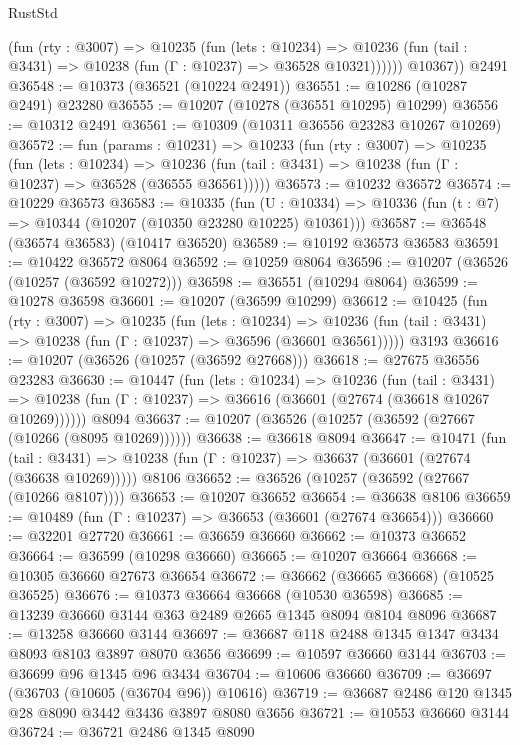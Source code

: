 \begin{lexlean}{RustStd}
\begin{coremodule}
            (fun (rty : @3007) =>
            @10235
              (fun (lets : @10234) =>
              @10236 (fun (tail : @3431) => @10238 (fun (Γ : @10237) => @36528 @10321))))))
        @10367))
    @2491
@36548 := @10373 (@36521 (@10224 @2491))
@36551 := @10286 (@10287 @2491) @23280
@36555 := @10207 (@10278 (@36551 @10295) @10299)
@36556 := @10312 @2491
@36561 := @10309 (@10311 @36556 @23283 @10267 @10269)
@36572 := fun (params : @10231) =>
  @10233
    (fun (rty : @3007) =>
    @10235
      (fun (lets : @10234) =>
      @10236 (fun (tail : @3431) => @10238 (fun (Γ : @10237) => @36528 (@36555 @36561)))))
@36573 := @10232 @36572
@36574 := @10229 @36573
@36583 := @10335
    (fun (U : @10334) => @10336 (fun (t : @7) => @10344 (@10207 (@10350 @23280 @10225) @10361)))
@36587 := @36548 (@36574 @36583) (@10417 @36520)
@36589 := @10192 @36573 @36583
@36591 := @10422 @36572 @8064
@36592 := @10259 @8064
@36596 := @10207 (@36526 (@10257 (@36592 @10272)))
@36598 := @36551 (@10294 @8064)
@36599 := @10278 @36598
@36601 := @10207 (@36599 @10299)
@36612 := @10425
    (fun (rty : @3007) =>
    @10235
      (fun (lets : @10234) =>
      @10236 (fun (tail : @3431) => @10238 (fun (Γ : @10237) => @36596 (@36601 @36561)))))
    @3193
@36616 := @10207 (@36526 (@10257 (@36592 @27668)))
@36618 := @27675 @36556 @23283
@36630 := @10447
    (fun (lets : @10234) =>
    @10236
      (fun (tail : @3431) =>
      @10238 (fun (Γ : @10237) => @36616 (@36601 (@27674 (@36618 @10267 @10269))))))
    @8094
@36637 := @10207 (@36526 (@10257 (@36592 (@27667 (@10266 (@8095 @10269))))))
@36638 := @36618 @8094
@36647 := @10471
    (fun (tail : @3431) => @10238 (fun (Γ : @10237) => @36637 (@36601 (@27674 (@36638 @10269)))))
    @8106
@36652 := @36526 (@10257 (@36592 (@27667 (@10266 @8107))))
@36653 := @10207 @36652
@36654 := @36638 @8106
@36659 := @10489 (fun (Γ : @10237) => @36653 (@36601 (@27674 @36654)))
@36660 := @32201 @27720
@36661 := @36659 @36660
@36662 := @10373 @36652
@36664 := @36599 (@10298 @36660)
@36665 := @10207 @36664
@36668 := @10305 @36660 @27673 @36654
@36672 := @36662 (@36665 @36668) (@10525 @36525)
@36676 := @10373 @36664 @36668 (@10530 @36598)
@36685 := @13239 @36660 @3144 @363 @2489 @2665 @1345 @8094 @8104 @8096
@36687 := @13258 @36660 @3144
@36697 := @36687 @118 @2488 @1345 @1347 @3434 @8093 @8103 @3897 @8070 @3656
@36699 := @10597 @36660 @3144
@36703 := @36699 @96 @1345 @96 @3434
@36704 := @10606 @36660
@36709 := @36697 (@36703 (@10605 (@36704 @96)) @10616)
@36719 := @36687 @2486 @120 @1345 @28 @8090 @3442 @3436 @3897 @8080 @3656
@36721 := @10553 @36660 @3144
@36724 := @36721 @2486 @1345 @8090

\end{coremodule}
\end{lexlean}
